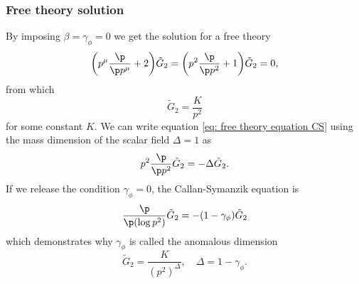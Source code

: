 \subsubsection{Free theory solution}
By imposing $\beta = \gamma_\phi = 0$ we get the solution for a free theory 
\begin{equation}
\label{eq: free theory equation CS}
    \bigg(p^\mu\frac{\p}{\p p^\mu} + 2\bigg)\tilde{G}_2 = \bigg(p^2\frac{\p}{\p p^2} + 1\bigg)\tilde{G}_2 = 0,
\end{equation}
from which
\begin{equation}
    \tilde{G}_2 = \frac{K}{p^2}
\end{equation}
for some constant $K$. We can write equation \eqref{eq: free theory equation CS} using the mass dimension of the scalar field $\Delta = 1$ as
\begin{equation}
    p^2\frac{\p}{\p p^2}\tilde{G}_2 = -\Delta \tilde{G}_2.
\end{equation}
If we release the condition $\gamma_\phi = 0$, the Callan-Symanzik equation is 
\begin{equation}
    \frac{\p}{\p(\log{p^2})}\tilde{G}_2 = -(1 - \gamma_\phi)\tilde{G}_2
\end{equation}
which demonstrates why $\gamma_\phi$ is called the anomalous dimension
\begin{equation}
    \tilde{G}_2 = \frac{K}{(p^2)^\Delta},\quad \Delta = 1 - \gamma_\phi.
\end{equation}


